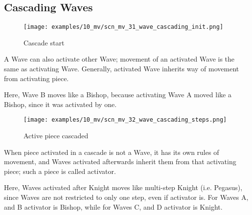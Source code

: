 \clearpage %

\subsection*{Cascading Waves}
\label{sec:Miranda's veil/Wave/Cascading Waves}

\vspace*{-1.4\baselineskip}
\noindent
\begin{figure}[h]
\texttt{[image: examples/10\_mv/scn\_mv\_31\_wave\_cascading\_init.png]}
\caption{Cascade start}
\label{fig:scn_mv_31_wave_cascading_init}
\end{figure}

A Wave can also activate other Wave; movement of an activated Wave is the same as
activating Wave. Generally, activated Wave inherits way of movement from activating
piece.

Here, Wave B moves like a Bishop, because activating Wave A moved like a Bishop,
since it was activated by one.

\clearpage %

\vspace*{-2.1\baselineskip}
\noindent
\begin{figure}[h]
\texttt{[image: examples/10\_mv/scn\_mv\_32\_wave\_cascading\_steps.png]}
\vspace*{-1.4\baselineskip}
\caption{Active piece cascaded}
\label{fig:scn_mv_32_wave_cascading_steps}
\end{figure}

\vspace*{-0.4\baselineskip}
When piece activated in a cascade is not a Wave, it has its own rules of movement, and
Waves activated afterwards inherit them from that activating piece; such a piece is
called activator.

Here, Waves activated after Knight moves like multi-step Knight (i.e. Pegasus), since
Waves are not restricted to only one step, even if activator is. For Waves A, and B
activator is Bishop, while for Waves C, and D activator is Knight.

